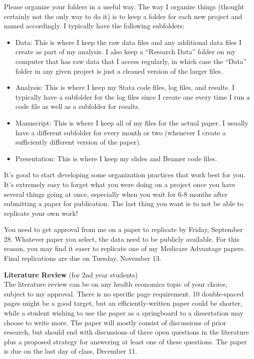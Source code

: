 \documentclass{article}
\begin{document}
Please organize your folders in a useful way. The way I organize things (thought certainly not the only way to do it) is to keep a folder for each new project and named accordingly. I typically have the following subfolders:
\begin{itemize}
    \item Data: This is where I keep the raw data files and any additional data files I create as part of my analysis. I also keep a ``Research Data'' folder on my computer that has raw data that I access regularly, in which case the ``Data'' folder in any given project is just a cleaned version of the larger files.
    \item Analysis: This is where I keep my Stata code files, log files, and results. I typically have a subfolder for the log files since I create one every time I run a code file as well as a subfolder for results.
    \item Manuscript: This is where I keep all of my files for the actual paper. I usually have a different subfolder for every month or two (whenever I create a sufficiently different version of the paper).
    \item Presentation: This is where I keep my slides and Beamer code files.
\end{itemize}
It's good to start developing some organization practices that work best for you. It's extremely easy to forget what you were doing on a project once you have several things going at once, especially when you wait for 6-8 months after submitting a paper for publication. The last thing you want is to not be able to replicate your own work!

You need to get approval from me on a paper to replicate by Friday, September 28. Whatever paper you select, the data need to be publicly available. For this reason, you may find it easer to replicate one of my Medicare Advantage papers. Final replications are due on Tuesday, November 13.

\medskip
\noindent \textbf{Literature Review} (for 2nd year students) \\
The literature review can be on any health economics topic of your choice, subject to my approval.  There is no specific page requirement.  10 double-spaced pages might be a good target, but an efficiently-written paper could be shorter, while a student wishing to use the paper as a springboard to a dissertation may choose to write more.  The paper will mostly consist of discussions of prior research, but should end with discussions of three open questions in the literature plus a proposed strategy for answering at least one of these questions.  The paper is due on the last day of class, December 11.
\end{document}
